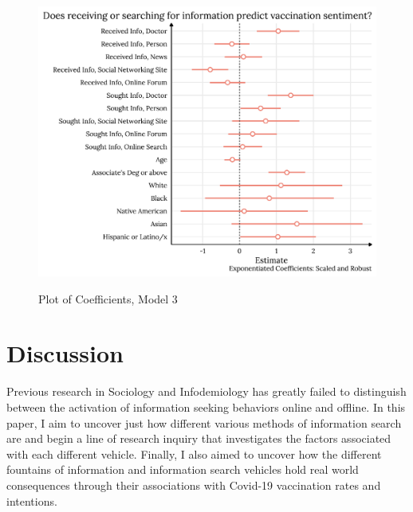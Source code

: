 \begin{figure}
{\centering \includegraphics[width=0.8\linewidth]{figs/paper2/plot-model-3-1}}
\caption{Plot of Coefficients, Model 3}\label{fig:plot-model-3}
\end{figure}

\hypertarget{discussion}{%
\section{Discussion}\label{discussion}}

Previous research in Sociology and Infodemiology has greatly failed to
distinguish between the activation of information seeking behaviors online and
offline. In this paper, I aim to uncover just how different various methods of
information search are and begin a line of research inquiry that investigates
the factors associated with each different vehicle. Finally, I also aimed to
uncover how the different fountains of information and information search
vehicles hold real world consequences through their associations with Covid-19
vaccination rates and intentions.

